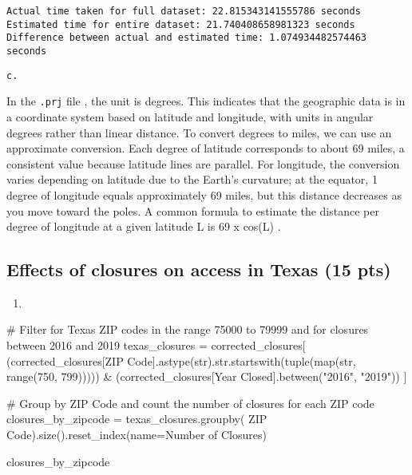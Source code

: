 \documentclass[
  letterpaper,
  DIV=11,
  numbers=noendperiod]{scrartcl}
\newenvironment{Shaded}{\begin{snugshade}}{\end{snugshade}}
\newcommand{\BuiltInTok}[1]{\textcolor[rgb]{0.00,0.23,0.31}{#1}}
\newcommand{\CommentTok}[1]{\textcolor[rgb]{0.37,0.37,0.37}{#1}}
\newcommand{\DecValTok}[1]{\textcolor[rgb]{0.68,0.00,0.00}{#1}}
\newcommand{\NormalTok}[1]{\textcolor[rgb]{0.00,0.23,0.31}{#1}}
\newcommand{\OperatorTok}[1]{\textcolor[rgb]{0.37,0.37,0.37}{#1}}
\newcommand{\StringTok}[1]{\textcolor[rgb]{0.13,0.47,0.30}{#1}}
\providecommand{\tightlist}{%
  \setlength{\itemsep}{0pt}\setlength{\parskip}{0pt}}\usepackage{longtable,booktabs,array}
\begin{document}
\begin{verbatim}
Actual time taken for full dataset: 22.815343141555786 seconds
Estimated time for entire dataset: 21.740408658981323 seconds
Difference between actual and estimated time: 1.074934482574463 seconds
\end{verbatim}

\begin{verbatim}
c.
\end{verbatim}

In the \texttt{.prj} file , the unit is degrees. This indicates that the
geographic data is in a coordinate system based on latitude and
longitude, with units in angular degrees rather than linear distance. To
convert degrees to miles, we can use an approximate conversion. Each
degree of latitude corresponds to about 69 miles, a consistent value
because latitude lines are parallel. For longitude, the conversion
varies depending on latitude due to the Earth's curvature; at the
equator, 1 degree of longitude equals approximately 69 miles, but this
distance decreases as you move toward the poles. A common formula to
estimate the distance per degree of longitude at a given latitude L is
69 x cos(L) .

\subsection{Effects of closures on access in Texas (15
pts)}\label{effects-of-closures-on-access-in-texas-15-pts}

\begin{enumerate}
\def\labelenumi{\arabic{enumi}.}
\tightlist
\item
\end{enumerate}

\begin{Shaded}
\begin{Highlighting}[]
\CommentTok{\# Filter for Texas ZIP codes in the range 75000 to 79999 and for closures between 2016 and 2019}
\NormalTok{texas\_closures }\OperatorTok{=}\NormalTok{ corrected\_closures[}
\NormalTok{    (corrected\_closures[}\StringTok{\textquotesingle{}ZIP Code\textquotesingle{}}\NormalTok{].astype(}\BuiltInTok{str}\NormalTok{).}\BuiltInTok{str}\NormalTok{.startswith(}\BuiltInTok{tuple}\NormalTok{(}\BuiltInTok{map}\NormalTok{(}\BuiltInTok{str}\NormalTok{, }\BuiltInTok{range}\NormalTok{(}\DecValTok{750}\NormalTok{, }\DecValTok{799}\NormalTok{))))) }\OperatorTok{\&}
\NormalTok{    (corrected\_closures[}\StringTok{\textquotesingle{}Year Closed\textquotesingle{}}\NormalTok{].between(}\StringTok{"2016"}\NormalTok{, }\StringTok{"2019"}\NormalTok{))}
\NormalTok{]}

\CommentTok{\# Group by ZIP Code and count the number of closures for each ZIP code}
\NormalTok{closures\_by\_zipcode }\OperatorTok{=}\NormalTok{ texas\_closures.groupby(}
    \StringTok{\textquotesingle{}ZIP Code\textquotesingle{}}\NormalTok{).size().reset\_index(name}\OperatorTok{=}\StringTok{\textquotesingle{}Number of Closures\textquotesingle{}}\NormalTok{)}

\NormalTok{closures\_by\_zipcode}
\end{Highlighting}
\end{Shaded}
\end{document}
